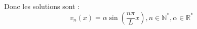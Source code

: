 \documentclass[12pt,a4paper]{article}
\begin{document}
\begin{enumerate}
\begin{itemize}
        Donc les solutions sont :
        \begin{equation}
            v_n(x) = \alpha \sin\left(\frac{n\pi}{L} x\right), n \in \mathbb{N}^*, \alpha \in \mathbb{R}^*
        \end{equation}


    \end{itemize}
    
\end{enumerate}
\end{document}
